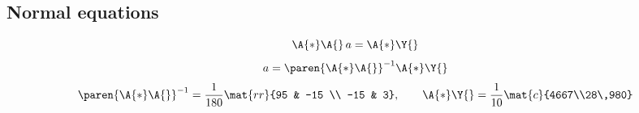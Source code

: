 \subsection{Normal equations}
  \begin{equation}
      \A{*}\A{}\,a = \A{*}\Y{}
  \end{equation}
  \begin{equation}
      a = \paren{\A{*}\A{}}^{-1}\A{*}\Y{}
  \end{equation}
  \begin{equation}
      \paren{\A{*}\A{}}^{-1} = \frac{1}{180}\mat{rr}{95 & -15 \\ -15 & 3}, \qquad 
      \A{*} \Y{} = \frac{1}{10}\mat{c}{4667\\28\,980}
  \end{equation}

\endinput  %

